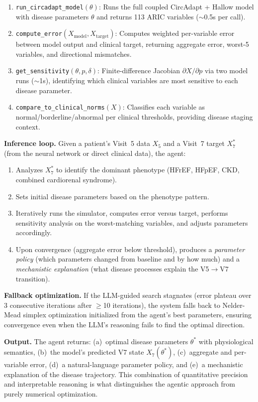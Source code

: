 \documentclass[pmlr]{jmlr}
\begin{document}
\begin{enumerate}
\item \texttt{run\_circadapt\_model}$(\theta)$: Runs the full coupled CircAdapt + Hallow model with disease parameters $\theta$ and returns 113 ARIC variables ($\sim$0.5s per call).
\item \texttt{compute\_error}$(X_{\text{model}}, X_{\text{target}})$: Computes weighted per-variable error between model output and clinical target, returning aggregate error, worst-5 variables, and directional mismatches.
\item \texttt{get\_sensitivity}$(\theta, p, \delta)$: Finite-difference Jacobian $\partial X / \partial p$ via two model runs ($\sim$1s), identifying which clinical variables are most sensitive to each disease parameter.
\item \texttt{compare\_to\_clinical\_norms}$(X)$: Classifies each variable as normal/borderline/abnormal per clinical thresholds, providing disease staging context.
\end{enumerate}

\textbf{Inference loop.} Given a patient's Visit~5 data $X_5$ and a Visit~7 target $X_7^*$ (from the neural network or direct clinical data), the agent:

\begin{enumerate}
\item Analyzes $X_7^*$ to identify the dominant phenotype (HFrEF, HFpEF, CKD, combined cardiorenal syndrome).
\item Sets initial disease parameters based on the phenotype pattern.
\item Iteratively runs the simulator, computes error versus target, performs sensitivity analysis on the worst-matching variables, and adjusts parameters accordingly.
\item Upon convergence (aggregate error below threshold), produces a \emph{parameter policy} (which parameters changed from baseline and by how much) and a \emph{mechanistic explanation} (what disease processes explain the V5$\to$V7 transition).
\end{enumerate}

\textbf{Fallback optimization.} If the LLM-guided search stagnates (error plateau over 3 consecutive iterations after $\geq$10 iterations), the system falls back to Nelder-Mead simplex optimization initialized from the agent's best parameters, ensuring convergence even when the LLM's reasoning fails to find the optimal direction.

\textbf{Output.} The agent returns: (a)~optimal disease parameters $\theta^*$ with physiological semantics, (b)~the model's predicted V7 state $X_7(\theta^*)$, (c)~aggregate and per-variable error, (d)~a natural-language parameter policy, and (e)~a mechanistic explanation of the disease trajectory. This combination of quantitative precision and interpretable reasoning is what distinguishes the agentic approach from purely numerical optimization.
\end{document}
